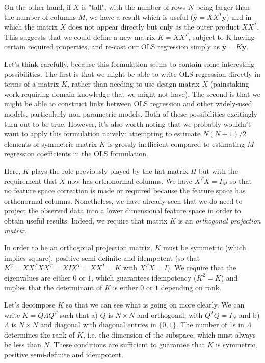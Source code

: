 \documentclass[11pt]{article}
\begin{document}
	On the other hand, if $X$ is "tall", with the number of rows $N$ being larger than the number of columns $M$, we have a result which is useful ($\boldsymbol{\hat{y}} = XX^{T}\boldsymbol{y}$) and in which the matrix $X$ does not appear directly but only as the outer product $XX^{T}$. This suggests that we could define a new matrix $K = XX^{T}$, subject to K having certain required properties, and re-cast our OLS regression simply as $\boldsymbol{\hat{y}} = K\boldsymbol{y}$.
	
	Let's think carefully, because this formulation seems to contain some interesting possibilities. The first is that we might be able to write OLS regression directly in terms of a matrix $K$, rather than needing to use design matrix $X$ (painstaking work requiring domain knowledge that we might not have). The second is that we might be able to construct links between OLS regression and other widely-used models, particularly non-parametric models. Both of these possibilities excitingly turn out to be true. However, it's also worth noting that we probably wouldn't want to apply this formulation naively: attempting to estimate $N(N+1)/2$ elements of symmetric matrix $K$ is grossly inefficient compared to estimating $M$ regression coefficients in the OLS formulation.
	
	Here, $K$ plays the role previously played by the hat matrix $H$ but with the requirement that $X$ now has orthonormal columns. We have $X^{T}X = I_{M}$ so that no feature space correction is made or required because the feature space has orthonormal columns. Nonetheless, we have already seen that we do need to project the observed data into a lower dimensional feature space in order to obtain useful results. Indeed, we require that matrix $K$ is an \emph{orthogonal projection matrix}. 
	
	In order to be an orthogonal projection matrix, $K$ must be symmetric (which implies square), positive semi-definite and idempotent (so that $K^{2} = XX^{T}XX^{T} = XIX^{T} = XX^{T} = K$ with $X^{T}X = I$). We require that the eigenvalues are either $0$ or $1$, which guarantees idempotency ($K^2 = K$) and implies that the determinant of $K$ is either $0$ or $1$ depending on rank.
	
	Let's decompose $K$ so that we can see what is going on more clearly. We can write $K = Q \Lambda Q^{T}$ such that a) $Q$ is $N \times N$ and orthogonal, with $Q^{T}Q = I_{N}$ and b) $\Lambda$ is $N \times N$ and diagonal with diagonal entries in $\{0, 1\}$. The number of 1s in $\Lambda$ determines the rank of $K$, i.e. the dimension of the subspace, which must always be less than $N$. These conditions are sufficient to guarantee that $K$ is symmetric, positive semi-definite and idempotent.
	
\end{document}
